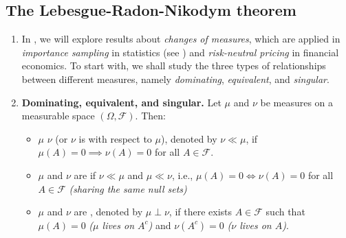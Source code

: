 \subsection{The Lebesgue-Radon-Nikodym theorem}
\label{subsect:leb-rn}
\begin{enumerate}
\item In , we will explore results about \emph{changes of
measures}, which are applied in \emph{importance sampling} in statistics (see
) and \emph{risk-neutral pricing} in financial
economics. To start with, we shall study the three types of relationships
between different measures, namely \emph{dominating}, \emph{equivalent}, and
\emph{singular}.
\item \textbf{Dominating, equivalent, and singular.} Let \(\mu\) and \(\nu\) be
measures on a measurable space \((\Omega,\mathcal{F})\). Then:
\begin{itemize}
\item \(\mu\)  \(\nu\) (or \(\nu\) is  with respect to \(\mu\)), denoted by \(\nu\ll\mu\), if
\(\mu(A)=0\implies \nu(A)=0\) for all \(A\in\mathcal{F}\).
\item \(\mu\) and \(\nu\) are  if \(\nu\ll\mu\) and
\(\mu\ll\nu\), i.e., \(\mu(A)=0\iff \nu(A)=0\) for all \(A\in\mathcal{F}\)
\emph{(sharing the same null sets)}
\item \(\mu\) and \(\nu\) are , denoted by \(\mu\perp\nu\), if
there exists \(A\in\mathcal{F}\) such that \(\mu(A)=0\) \emph{(\(\mu\) lives on
\(A^{c}\))} and \(\nu(A^{c})=0\) \emph{(\(\nu\) lives on \(A\))}.


\end{itemize}
\end{enumerate}
